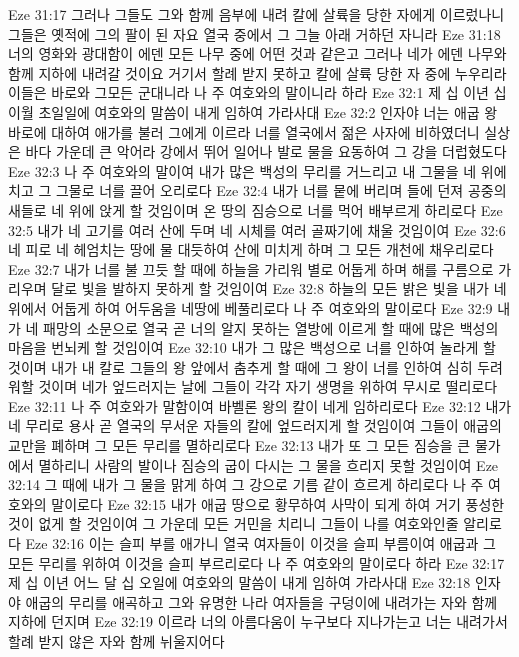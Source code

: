 Eze 31:17  그러나 그들도 그와 함께 음부에 내려 칼에 살륙을 당한 자에게 이르렀나니 그들은 옛적에 그의 팔이 된 자요 열국 중에서 그 그늘 아래 거하던 자니라
Eze 31:18  너의 영화와 광대함이 에덴 모든 나무 중에 어떤 것과 같은고 그러나 네가 에덴 나무와 함께 지하에 내려갈 것이요 거기서 할례 받지 못하고 칼에 살륙 당한 자 중에 누우리라 이들은 바로와 그모든 군대니라 나 주 여호와의 말이니라 하라
Eze 32:1  제 십 이년 십 이월 초일일에 여호와의 말씀이 내게 임하여 가라사대
Eze 32:2  인자야 너는 애굽 왕 바로에 대하여 애가를 불러 그에게 이르라 너를 열국에서 젊은 사자에 비하였더니 실상은 바다 가운데 큰 악어라 강에서 뛰어 일어나 발로 물을 요동하여 그 강을 더럽혔도다
Eze 32:3  나 주 여호와의 말이여 내가 많은 백성의 무리를 거느리고 내 그물을 네 위에 치고 그 그물로 너를 끌어 오리로다
Eze 32:4  내가 너를 뭍에 버리며 들에 던져 공중의 새들로 네 위에 앉게 할 것임이며 온 땅의 짐승으로 너를 먹어 배부르게 하리로다
Eze 32:5  내가 네 고기를 여러 산에 두며 네 시체를 여러 골짜기에 채울 것임이여
Eze 32:6  네 피로 네 헤엄치는 땅에 물 대듯하여 산에 미치게 하며 그 모든 개천에 채우리로다
Eze 32:7  내가 너를 불 끄듯 할 때에 하늘을 가리워 별로 어둡게 하며 해를 구름으로 가리우며 달로 빛을 발하지 못하게 할 것임이여
Eze 32:8  하늘의 모든 밝은 빛을 내가 네 위에서 어둡게 하여 어두움을 네땅에 베풀리로다 나 주 여호와의 말이로다
Eze 32:9  내가 네 패망의 소문으로 열국 곧 너의 알지 못하는 열방에 이르게 할 때에 많은 백성의 마음을 번뇌케 할 것임이여
Eze 32:10  내가 그 많은 백성으로 너를 인하여 놀라게 할 것이며 내가 내 칼로 그들의 왕 앞에서 춤추게 할 때에 그 왕이 너를 인하여 심히 두려워할 것이며 네가 엎드러지는 날에 그들이 각각 자기 생명을 위하여 무시로 떨리로다
Eze 32:11  나 주 여호와가 말함이여 바벨론 왕의 칼이 네게 임하리로다
Eze 32:12  내가 네 무리로 용사 곧 열국의 무서운 자들의 칼에 엎드러지게 할 것임이여 그들이 애굽의 교만을 폐하며 그 모든 무리를 멸하리로다
Eze 32:13  내가 또 그 모든 짐승을 큰 물가에서 멸하리니 사람의 발이나 짐승의 굽이 다시는 그 물을 흐리지 못할 것임이여
Eze 32:14  그 때에 내가 그 물을 맑게 하여 그 강으로 기름 같이 흐르게 하리로다 나 주 여호와의 말이로다
Eze 32:15  내가 애굽 땅으로 황무하여 사막이 되게 하여 거기 풍성한 것이 없게 할 것임이여 그 가운데 모든 거민을 치리니 그들이 나를 여호와인줄 알리로다
Eze 32:16  이는 슬피 부를 애가니 열국 여자들이 이것을 슬피 부름이여 애굽과 그 모든 무리를 위하여 이것을 슬피 부르리로다 나 주 여호와의 말이로다 하라
Eze 32:17  제 십 이년 어느 달 십 오일에 여호와의 말씀이 내게 임하여 가라사대
Eze 32:18  인자야 애굽의 무리를 애곡하고 그와 유명한 나라 여자들을 구덩이에 내려가는 자와 함께 지하에 던지며
Eze 32:19  이르라 너의 아름다움이 누구보다 지나가는고 너는 내려가서 할례 받지 않은 자와 함께 뉘울지어다
